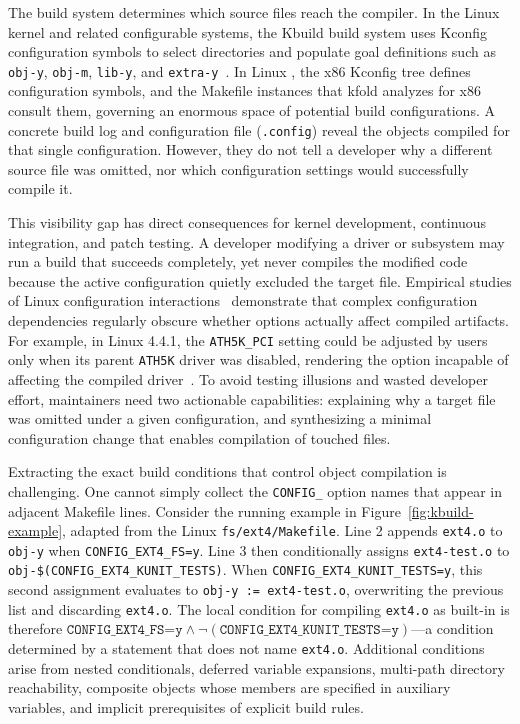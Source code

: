 \documentclass[acmsmall]{acmart}
\newcommand{\tool}{\textsf{kfold}\xspace}
\begin{document}
The build system determines which source files reach the compiler.
In the Linux kernel and related configurable systems, the Kbuild build system uses Kconfig configuration symbols to select directories and populate goal definitions such as \texttt{obj-y}, \texttt{obj-m}, \texttt{lib-y}, and \texttt{extra-y}~\cite{berger2010variability,berger2013variability,dietrich2012variability,dietrich2018variability}.
In Linux \NLinuxVersion, the x86 Kconfig tree defines \NKconfigDefined configuration symbols, and the \NLinuxInstances Makefile instances that \tool analyzes for x86 consult them, governing an enormous space of potential build configurations.
A concrete build log and configuration file (\texttt{.config}) reveal the objects compiled for that single configuration.
However, they do not tell a developer why a different source file was omitted, nor which configuration settings would successfully compile it.

This visibility gap has direct consequences for kernel development, continuous integration, and patch testing.
A developer modifying a driver or subsystem may run a build that succeeds completely, yet never compiles the modified code because the active configuration quietly excluded the target file.
Empirical studies of Linux configuration interactions~\cite{passos2013coevolution,melo2016variability,nadi2014where,nadi2014mining,abal2014variability,tartler2011dead} demonstrate that complex configuration dependencies regularly obscure whether options actually affect compiled artifacts.
For example, in Linux 4.4.1, the \texttt{ATH5K\_PCI} setting could be adjusted by users only when its parent \texttt{ATH5K} driver was disabled, rendering the option incapable of affecting the compiled driver~\cite{passos2013coevolution}.
To avoid testing illusions and wasted developer effort, maintainers need two actionable capabilities: explaining why a target file was omitted under a given configuration, and synthesizing a minimal configuration change that enables compilation of touched files.

Extracting the exact build conditions that control object compilation is challenging.
One cannot simply collect the \texttt{CONFIG\_} option names that appear in adjacent Makefile lines.
Consider the running example in Figure~\ref{fig:kbuild-example}, adapted from the Linux \NLinuxVersion \texttt{fs/ext4/Makefile}.
Line 2 appends \texttt{ext4.o} to \texttt{obj-y} when \texttt{CONFIG\_EXT4\_FS=y}.
Line 3 then conditionally assigns \texttt{ext4-test.o} to \texttt{obj-\$(CONFIG\_EXT4\_KUNIT\_TESTS)}.
When \texttt{CONFIG\_EXT4\_KUNIT\_TESTS=y}, this second assignment evaluates to \texttt{obj-y := ext4-test.o}, overwriting the previous list and discarding \texttt{ext4.o}.
The local condition for compiling \texttt{ext4.o} as built-in is therefore $\texttt{CONFIG\_EXT4\_FS=y} \land \neg(\texttt{CONFIG\_EXT4\_KUNIT\_TESTS=y})$---a condition determined by a statement that does not name \texttt{ext4.o}.
Additional conditions arise from nested conditionals, deferred variable expansions, multi-path directory reachability, composite objects whose members are specified in auxiliary variables, and implicit prerequisites of explicit build rules.
\end{document}
